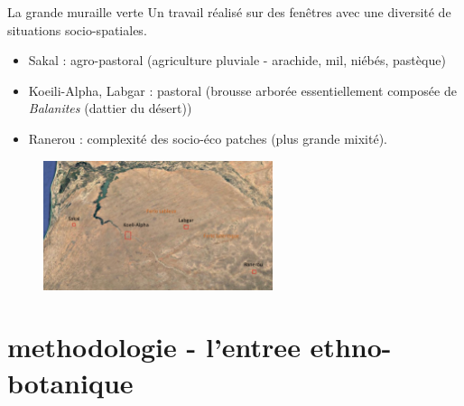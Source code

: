 \documentclass[newPxFont]{beamer}
\begin{document}
\begin{frame}[c]{La grande muraille verte}
\vspace{-1cm}
Un travail réalisé sur des fenêtres avec une diversité de situations socio-spatiales.
\small{
\begin{itemize}
  \item Sakal : agro-pastoral (agriculture pluviale - arachide, mil, niébés, pastèque)
  \item Koeili-Alpha, Labgar : pastoral (brousse arborée essentiellement composée de \textit{Balanites} (dattier du désert))
  \item Ranerou : complexité des socio-éco patches (plus grande mixité).
\end{itemize}}
\begin{figure}
	\centering
	\includegraphics[width = 0.6\textwidth]{img/windows.png}
\end{figure}
\end{frame}

\section{methodologie - l'entree ethno-botanique}
\end{document}
